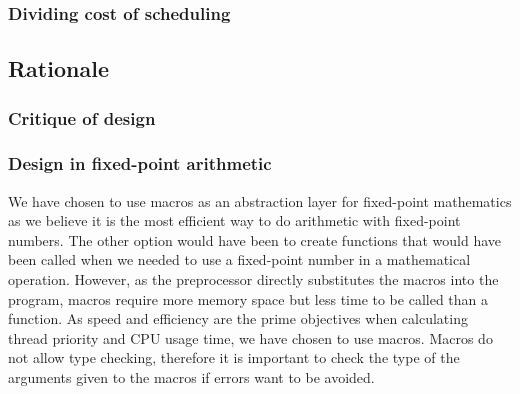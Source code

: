 \documentclass{article}
\renewcommand{\_}{\char`_}
\begin{document}
\subsubsection{Dividing cost of scheduling}

\subsection{Rationale}
\subsubsection{Critique of design}

\subsubsection{Design in fixed-point arithmetic}

We have chosen to use macros as an abstraction layer for fixed-point mathematics as we believe it is the most efficient way to do arithmetic with fixed-point numbers. The other option would have been to create functions that would have been called when we needed to use a fixed-point number in a mathematical operation. However, as the preprocessor directly substitutes the macros into the program, macros require more memory space but less time to be called than a function. As speed and efficiency are the prime objectives when calculating thread priority and CPU usage time, we have chosen to use macros.
Macros do not allow type checking, therefore it is important to check the type of the arguments given to the macros if errors want to be avoided.

\end{document}

